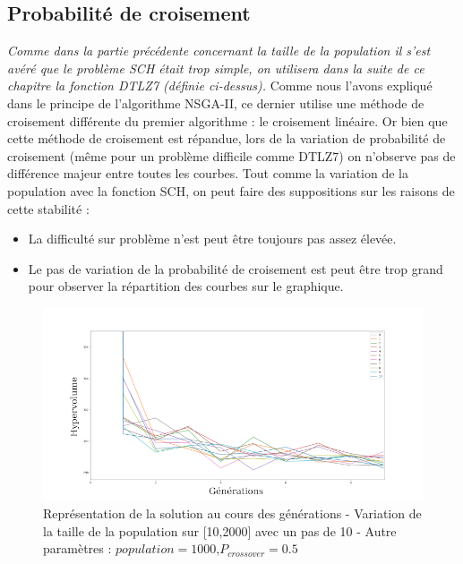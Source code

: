 \documentclass[12pt]{report}
\begin{document}
      \subsection{Probabilité de croisement}
      \emph{Comme dans la partie précédente concernant la taille de la population il s'est avéré que le problème SCH était trop simple, on utilisera dans la suite de ce chapitre la fonction DTLZ7 (définie ci-dessus).}
      Comme nous l'avons expliqué dans le principe de l'algorithme NSGA-II, ce dernier utilise une méthode de croisement différente du premier algorithme : le croisement linéaire.
      Or bien que cette méthode de croisement est répandue, lors de la variation de probabilité de croisement (même pour un problème difficile comme DTLZ7) on n'observe pas de différence majeur entre toutes les courbes. Tout comme la variation de la population avec la fonction SCH, on peut faire des suppositions sur les raisons de cette stabilité :
      \begin{itemize}
        \item La difficulté sur problème n'est peut être toujours pas assez élevée.
        \item Le pas de variation de la probabilité de croisement est peut être trop grand pour observer la répartition des courbes sur le graphique.
      \end{itemize}

      \begin{figure}[h]
        \centering
        \includegraphics[width=15cm]{img/DTLZ7_crossover.png}
        \caption{Représentation de la solution au cours des générations - Variation de la taille de la population sur [10,2000] avec un pas de 10 - Autre paramètres : $population = 1000$,$P_{crossover} = 0.5$}
        \label{sch_crossover_moy}
      \end{figure}
\end{document}
